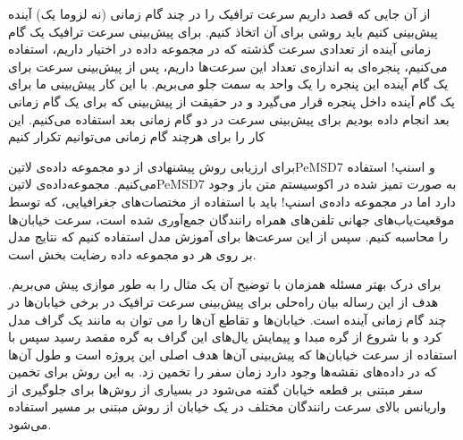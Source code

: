 از آن جایی که قصد داریم سرعت ترافیک را در چند گام زمانی (نه لزوما یک) آینده پیش‌بینی کنیم باید روشی برای آن اتخاذ کنیم. برای پیش‌بینی سرعت ترافیک یک گام زمانی آینده از تعدادی سرعت گذشته که در مجموعه داده در اختیار داریم، استفاده می‌کنیم، پنجره‌ای به اندازه‌ی تعداد این سرعت‌ها داریم، پس از پیش‌بینی سرعت برای یک گام آینده این پنجره را یک واحد به سمت جلو می‌بریم. با این کار پیش‌بینی ما برای یک گام آینده داخل پنجره قرار می‌گیرد و در حقیقت از پیش‌بینی که برای یک گام زمانی بعد انجام داده بودیم برای پیش‌بینی سرعت در دو گام زمانی بعد استفاده می‌کنیم. این کار را برای هرچند گام زمانی می‌توانیم تکرار کنیم

برای ارزیابی روش پیشنهادی از دو مجموعه داده‌ی ‌لاتین{PeMSD7} و اسنپ! استفاده می‌کنیم. مجموعه‌داده‌ی ‌لاتین{PeMSD7} به صورت تمیز شده در اکوسیستم متن باز وجود دارد
اما در مجموعه داده‌ی اسنپ! باید با استفاده از مختصات‌های جغرافیایی، که توسط موقعیت‌یاب‌های
جهانی تلفن‌های همراه رانندگان جمع‌آوری شده است، سرعت خیابان‌ها را محاسبه کنیم.
سپس از این سرعت‌ها برای آموزش مدل استفاده کنیم که نتایج مدل بر روی هر دو مجموعه داده رضایت بخش است.


برای درک بهتر مسئله همزمان با توضیح آن یک مثال را به طور موازی پیش می‌بریم.
هدف از این رساله بیان راه‌حلی برای پیش‌بینی سرعت ترافیک در برخی خیابان‌ها در چند گام زمانی آینده است. خیابان‌ها و تقاطع آن‌ها را می توان به مانند یک گراف مدل کرد و با شروع از گره مبدا و پیمایش یال‌های این گراف به گره مقصد رسید سپس با استفاده از سرعت خیابان‌ها که پیش‌بینی آن‌ها هدف اصلی این پروژه است و طول آن‌ها که در داده‌های نقشه‌ها وجود دارد زمان سفر را تخمین زد. به این روش برای تخمین سفر مبتنی بر قطعه خیابان  گفته می‌شود در بسیاری از روش‌ها برای جلوگیری از واریانس بالای سرعت رانندگان مختلف در یک خیابان از روش مبتنی بر مسیر  استفاده می‌شود.


